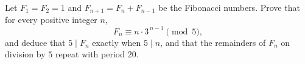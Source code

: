 Let $F_1=F_2=1$ and $F_{n+1}=F_n+F_{n-1}$ be the Fibonacci numbers. Prove that for every positive integer $n$,
\[F_n\equiv n\cdot3^{\,n-1}\pmod5,\]
and deduce that $5\mid F_n$ exactly when $5\mid n$, and that the remainders of $F_n$ on division by $5$ repeat with period $20$.

